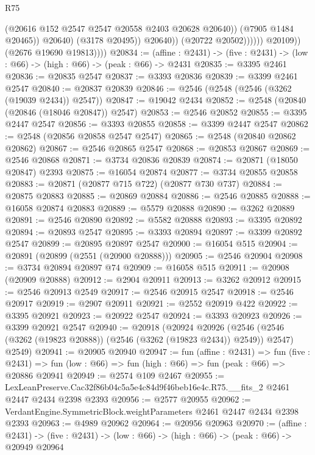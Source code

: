 \begin{lexlean}{R75}
\begin{coremodule}
                                    (@20616 @152 @2547 @2547 @20558 @2403 @20628 @20640))
                                  (@7905 @1484 @20465))
                                @20640)
                              (@3178 @20495))
                            @20640))
                        (@20722 @20502))))))
              @20109))
          (@2676 @19690 @19813))))
@20834 := (affine : @2431) -> (five : @2431) -> (low : @66) -> (high : @66) -> (peak : @66) -> @2431
@20835 := @3395 @2461
@20836 := @20835 @2547
@20837 := @3393 @20836
@20839 := @3399 @2461 @2547
@20840 := @20837 @20839
@20846 := @2546 (@2548 (@2546 (@3262 (@19039 @2434)) @2547))
@20847 := @19042 @2434
@20852 := @2548 (@20840 (@20846 (@18046 @20847)) @2547)
@20853 := @2546 @20852
@20855 := @3395 @2447 @2547
@20856 := @3393 @20855
@20858 := @3399 @2447 @2547
@20862 := @2548 (@20856 @20858 @2547 @2547)
@20865 := @2548 (@20840 @20862 @20862)
@20867 := @2546 @20865 @2547
@20868 := @20853 @20867
@20869 := @2546 @20868
@20871 := @3734 @20836 @20839
@20874 := @20871 (@18050 @20847) @2393
@20875 := @16054 @20874
@20877 := @3734 @20855 @20858
@20883 := @20871 (@20877 @715 @722) (@20877 @730 @737)
@20884 := @20875 @20883
@20885 := @20869 @20884
@20886 := @2546 @20885
@20888 := @16058 @20874 @20883
@20889 := @5579 @20888
@20890 := @3262 @20889
@20891 := @2546 @20890
@20892 := @5582 @20888
@20893 := @3395 @20892
@20894 := @20893 @2547
@20895 := @3393 @20894
@20897 := @3399 @20892 @2547
@20899 := @20895 @20897 @2547
@20900 := @16054 @515
@20904 := @20891 (@20899 (@2551 (@20900 @20888)))
@20905 := @2546 @20904
@20908 := @3734 @20894 @20897 @74
@20909 := @16058 @515
@20911 := @20908 (@20909 @20888)
@20912 := @2904 @20911
@20913 := @3262 @20912
@20915 := @2546 @20913 @2549
@20917 := @2546 @20915 @2547
@20918 := @2546 @20917
@20919 := @2907 @20911
@20921 := @2552 @20919 @422
@20922 := @3395 @20921
@20923 := @20922 @2547
@20924 := @3393 @20923
@20926 := @3399 @20921 @2547
@20940 := @20918
    (@20924
      @20926
      (@2546 (@2546 (@3262 (@19823 @20888)) (@2546 (@3262 (@19823 @2434)) @2549)) @2547)
      @2549)
@20941 := @20905 @20940
@20947 := fun (affine : @2431) =>
  fun (five : @2431) => fun (low : @66) => fun (high : @66) => fun (peak : @66) => @20886 @20941
@20949 := @2574 @109 @2467
@20955 := LexLeanPreserve.Cac32f86b04c5a5e4c84d9f46beb16e4c.R75.__fits_2
    @2461
    @2447
    @2434
    @2398
    @2393
@20956 := @2577 @20955
@20962 := VerdantEngine.SymmetricBlock.weightParameters @2461 @2447 @2434 @2398 @2393
@20963 := @4989 @20962
@20964 := @20956 @20963
@20970 := (affine : @2431) ->
  (five : @2431) -> (low : @66) -> (high : @66) -> (peak : @66) -> @20949 @20964

\end{coremodule}
\end{lexlean}
